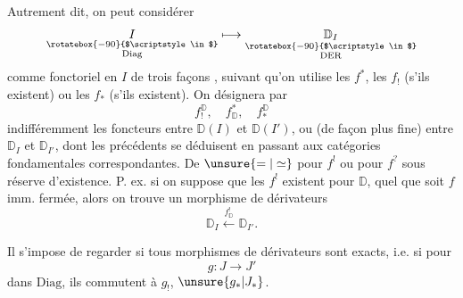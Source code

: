 Autrement dit, on peut considérer
\[
\underset{\substack{\rotatebox{-90}{$\scriptstyle\in$}\\\mathrm{Diag}}}{I}
\longmapsto
\underset{\substack{\rotatebox{-90}{$\scriptstyle\in$}\\\mathrm{DER}}}{\mathbb D_I}
\]
comme fonctoriel  en $I$ de trois façons , suivant qu'on utilise les $f^*$, les $f_!$ (s'ils existent) ou les $f_*$ (s'ils existent). On désignera par
\[
f^{\mathbb D}_!,\quad f^*_{\mathbb D},\quad f^{\mathbb D}_*
\]
indifféremment les foncteurs entre $\mathbb D(I)$ et $\mathbb D(I')$, ou (de façon plus fine) entre $\mathbb D_I$ et $\mathbb D_{I'}$, dont les précédents se déduisent en passant aux catégories fondamentales correspondantes. De $\unsure{=|\simeq}$ pour $f^!$ ou pour $f^?$ sous réserve d'existence. P. ex. si on suppose que les $f^!$ existent pour $\mathbb D$, quel que soit $f$ imm. fermée, alors on trouve  un morphisme de dérivateurs
\[
\mathbb D_I\xleftarrow{f^!_{\mathbb D}}\mathbb D_{I'}.
\]

Il s'impose de regarder si tous  morphismes de dérivateurs sont exacts, i.e. si pour
\[
g:J\longrightarrow J'
\]
dans $\mathrm{Diag}$, ils commutent à $g_!$, $\unsure{g_*|J_*}$.
